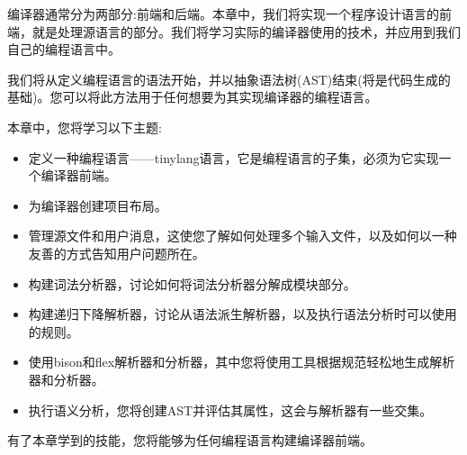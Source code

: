 编译器通常分为两部分:前端和后端。本章中，我们将实现一个程序设计语言的前端，就是处理源语言的部分。我们将学习实际的编译器使用的技术，并应用到我们自己的编程语言中。\par

我们将从定义编程语言的语法开始，并以抽象语法树(AST)结束(将是代码生成的基础)。您可以将此方法用于任何想要为其实现编译器的编程语言。\par

本章中，您将学习以下主题:\par


\begin{itemize}
\item 定义一种编程语言——tinylang语言，它是编程语言的子集，必须为它实现一个编译器前端。
\item 为编译器创建项目布局。
\item 管理源文件和用户消息，这使您了解如何处理多个输入文件，以及如何以一种友善的方式告知用户问题所在。
\item 构建词法分析器，讨论如何将词法分析器分解成模块部分。
\item 构建递归下降解析器，讨论从语法派生解析器，以及执行语法分析时可以使用的规则。
\item 使用bison和flex解析器和分析器，其中您将使用工具根据规范轻松地生成解析器和分析器。
\item 执行语义分析，您将创建AST并评估其属性，这会与解析器有一些交集。
\end{itemize}

有了本章学到的技能，您将能够为任何编程语言构建编译器前端。\par